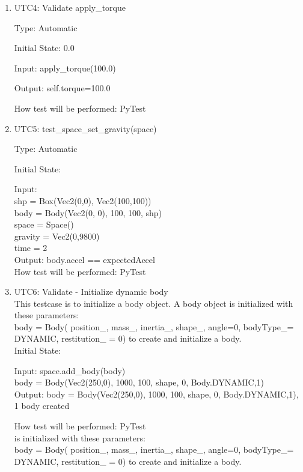 \documentclass[12pt, titlepage]{article}
\begin{document}
\begin{enumerate}
\item{UTC4}{: Validate apply\_torque\\}

Type: Automatic

Initial State: 0.0

Input: apply\_torque(100.0)

Output: self.torque=100.0

How test will be performed: PyTest

\item{UTC5}{: test\_space\_set\_gravity(space)\\}

Type: Automatic

Initial State: 

Input: \\
shp = Box(Vec2(0,0), Vec2(100,100))\\
body = Body(Vec2(0, 0), 100, 100, shp)\\
space = Space()\\
gravity = Vec2(0,9800)\\
time = 2\\

Output: body.accel == expectedAccel\\

How test will be performed: PyTest\\

\item{UTC6}{: Validate - Initialize dynamic body\\}
This testcase is to initialize a body object.
A body object is initialized with these parameters:\\ 
body = Body( position\_, mass\_, inertia\_, shape\_, angle=0, bodyType\_= DYNAMIC, restitution\_ = 0) to create and initialize a body.\\

Initial State: 

Input: space.add\_body(body)\\
body = Body(Vec2(250,0), 1000, 100, shape, 0, Body.DYNAMIC,1)\\

Output: body = Body(Vec2(250,0), 1000, 100, shape, 0, Body.DYNAMIC,1), 1 body created

How test will be performed: PyTest\\ is initialized with these parameters:\\ 
body = Body( position\_, mass\_, inertia\_, shape\_, angle=0, bodyType\_= DYNAMIC, restitution\_ = 0) to create and initialize a body.\\


\end{enumerate}
\end{document}
